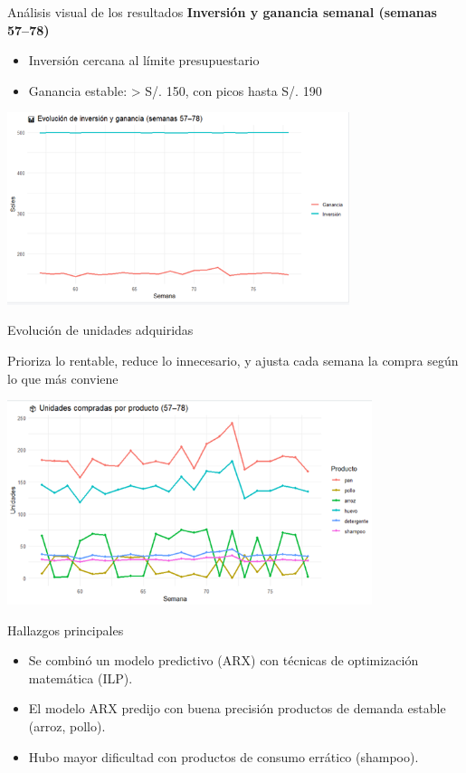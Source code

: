 \documentclass{beamer}
\begin{document}
\begin{frame}{An\'alisis visual de los resultados}
\textbf{Inversi\'on y ganancia semanal (semanas 57--78)}
\begin{itemize}
    \item Inversi\'on cercana al l\'imite presupuestario
    \item Ganancia estable: > S/. 150, con picos hasta S/. 190
\end{itemize}
\vspace{0.3cm}
\includegraphics[width=0.75\textwidth]{Imagen3.png}
\end{frame}

\begin{frame}{Evoluci\'on de unidades adquiridas}
\begin{itemize}
    Prioriza lo rentable, reduce lo innecesario, y ajusta cada semana la compra según lo que más conviene
\end{itemize}
\vspace{0.3cm}
\includegraphics[width=0.8\textwidth]{uproducto1.png}
\end{frame}

\begin{frame}{Hallazgos principales}
\begin{itemize}
    \item Se combinó un modelo predictivo (ARX) con técnicas de optimización matemática (ILP).
    \item El modelo ARX predijo con buena precisión productos de demanda estable (arroz, pollo).
    \item Hubo mayor dificultad con productos de consumo errático (shampoo).
\end{itemize}
\end{frame}
\end{document}
